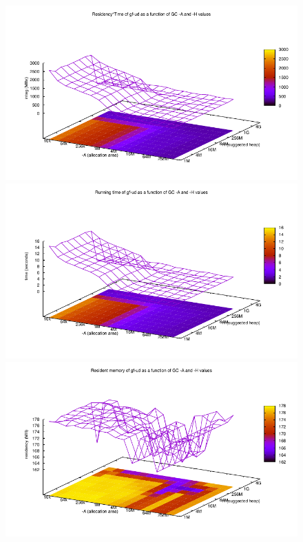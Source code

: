 \begin{figure}
    \centering
      {\includegraphics[scale=0.5]{thesis/figure/gf-ud-integ-gc-space.pdf}}
      {\includegraphics[scale=0.5]{thesis/figure/gf-ud-time-gc-space.pdf}}
      {\includegraphics[scale=0.5]{thesis/figure/gf-ud-residency-gc-space.pdf}}

\end{figure}
